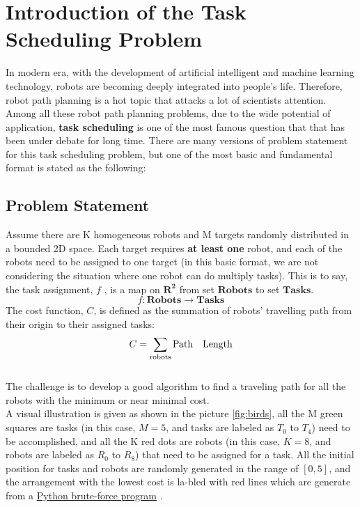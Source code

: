 \chapter{Introduction of the Task Scheduling Problem}
In modern era, with the development of artificial intelligent and machine learning technology, robots are becoming deeply integrated into people's life. Therefore, robot path planning is a hot topic that attacks a lot of scientists attention. Among all these robot path planning problems, due to the wide potential of application, \textbf{task scheduling} is one of the most famous question that that has been under debate for long time. There are many versions of problem statement for this task scheduling problem, but one of the most basic and fundamental format is stated as the following: 
\section{Problem Statement}
Assume there are K homogeneous robots and M targets randomly distributed in a bounded 2D space. Each target requires \textbf{at least one} robot, and each of the robots need to be assigned to one target (in this basic format, we are not considering the situation where one robot can do multiply tasks). This is to say, the task assignment, $f$ , is a map on $\mathbf{R^2}$ from set $\mathbf{Robots}$ to set $\mathbf{Tasks}$. 
\begin{equation}
    f:{\mathbf{Robots}} \to \mathbf{Tasks}
\end{equation}
The cost function, $C$, is defined as the summation of robots' travelling path from their origin to their assigned tasks:
\begin{equation}
   C = \sum\limits_{{\rm{robots}}} {{\rm{Path\quad } \rm{Length}}} 
\end{equation}
\\
The challenge is to develop a good algorithm to find a traveling path for all the robots with the minimum or near minimal cost.
\\
A visual illustration is given as shown in the picture \ref{fig:birds}, all the M green squares are tasks (in this case, $M=5$, and tasks are labeled as $T_0$ to $T_4$) need to be accomplished, and all the K red dots are robots (in this case, $K=8$, and robots are labeled as $R_0$ to $R_8$) that need to be assigned for a task. All the initial position for tasks and robots are randomly generated in the range of $[0,5]$, and the arrangement with the lowest cost is la-bled with red lines which are generate from a \href{https://github.com/ENGG6570/Group-Project/tree/main/ENGG6570_Project}{Python brute-force program}  . 

